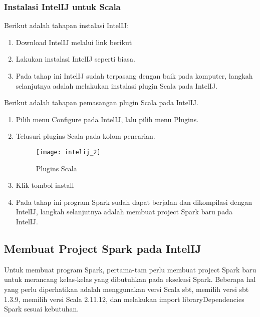 \newpage
\subsubsection{Instalasi IntelIJ untuk Scala}
Berikut adalah tahapan instalasi IntelIJ:

\begin{enumerate}
\item Download IntelIJ melalui link berikut 

\item Lakukan instalasi IntelIJ seperti biasa.

\item Pada tahap ini IntelIJ sudah terpasang dengan baik pada komputer, langkah selanjutnya adalah melakukan instalasi plugin Scala pada IntelIJ.

\end{enumerate}

\noindent Berikut adalah tahapan pemasangan plugin Scala pada IntelIJ.

\begin{enumerate}

\item Pilih menu Configure pada IntelIJ, lalu pilih menu Plugins.

\item Telusuri plugins Scala pada kolom pencarian.
\begin{figure}[H]
	\centering
	\texttt{[image: intelij\_2]}
	\caption{Plugins Scala}
	\label{fig:intelij_2}
\end{figure}

\item Klik tombol install

\item Pada tahap ini program Spark sudah dapat berjalan dan dikompilasi dengan IntelIJ, langkah selanjutnya adalah membuat project Spark baru pada IntelIJ.

\end{enumerate}


\newpage
\subsection{Membuat Project Spark pada IntelIJ}
Untuk membuat program Spark, pertama-tam perlu membuat project Spark baru untuk merancang kelas-kelas yang dibutuhkan pada eksekusi Spark. Beberapa hal yang perlu diperhatikan adalah menggunakan versi Scala sbt, memilih versi sbt 1.3.9, memilih versi Scala 2.11.12, dan melakukan import libraryDependencies Spark sesuai kebutuhan.\\

